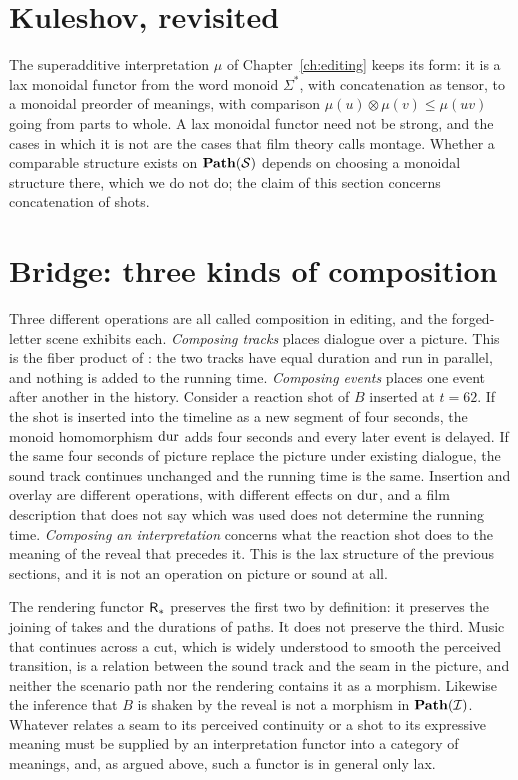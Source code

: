 \section{Kuleshov, revisited}

The superadditive interpretation $\mu$ of Chapter~\ref{ch:editing} keeps its form: it is a lax monoidal functor from the word monoid $\Sigma^*$, with concatenation as tensor, to a monoidal preorder of meanings, with comparison $\mu(u)\otimes\mu(v)\le\mu(uv)$ going from parts to whole. A lax monoidal functor need not be strong, and the cases in which it is not are the cases that film theory calls montage. Whether a comparable structure exists on $\mathbf{Path}(\mathcal{S})$ depends on choosing a monoidal structure there, which we do not do; the claim of this section concerns concatenation of shots.

\section{Bridge: three kinds of composition}

Three different operations are all called composition in editing, and the forged-letter scene exhibits each. \emph{Composing tracks} places dialogue over a picture. This is the fiber product of : the two tracks have equal duration and run in parallel, and nothing is added to the running time. \emph{Composing events} places one event after another in the history. Consider a reaction shot of $B$ inserted at $t=62$. If the shot is inserted into the timeline as a new segment of four seconds, the monoid homomorphism $\operatorname{dur}$ adds four seconds and every later event is delayed. If the same four seconds of picture replace the picture under existing dialogue, the sound track continues unchanged and the running time is the same. Insertion and overlay are different operations, with different effects on $\operatorname{dur}$, and a film description that does not say which was used does not determine the running time. \emph{Composing an interpretation} concerns what the reaction shot does to the meaning of the reveal that precedes it. This is the lax structure of the previous sections, and it is not an operation on picture or sound at all.

The rendering functor $\mathsf{R}_*$ preserves the first two by definition: it preserves the joining of takes and the durations of paths. It does not preserve the third. Music that continues across a cut, which is widely understood to smooth the perceived transition, is a relation between the sound track and the seam in the picture, and neither the scenario path nor the rendering contains it as a morphism. Likewise the inference that $B$ is shaken by the reveal is not a morphism in $\mathbf{Path}(\mathcal{I})$. Whatever relates a seam to its perceived continuity or a shot to its expressive meaning must be supplied by an interpretation functor into a category of meanings, and, as argued above, such a functor is in general only lax.

